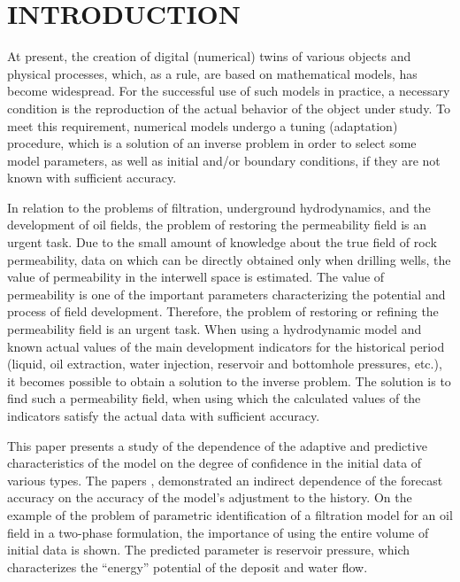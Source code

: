 \documentclass[
11pt,%
tightenlines,%
twoside,%
onecolumn,%
nofloats,%
nobibnotes,%
nofootinbib,%
superscriptaddress,%
noshowpacs,%
centertags]%
{revtex4}
\begin{document}
\section{INTRODUCTION}
	At present, the creation of digital (numerical) twins of various objects and physical processes, which, as a rule, are based on mathematical models, has become widespread. For the successful use of such models in practice, a necessary condition is the reproduction of the actual behavior of the object under study. To meet this requirement, numerical models undergo a tuning (adaptation) procedure, which is a solution of an inverse problem in order to select some model parameters, as well as initial and/or boundary conditions, if they are not known with sufficient accuracy. 
	
	In relation to the problems of filtration, underground hydrodynamics, and the development of oil fields, the problem of restoring the permeability field is an urgent task. Due to the small amount of knowledge about the true field of rock permeability, data on which can be directly obtained only when drilling wells, the value of permeability in the interwell space is estimated. The value of permeability is one of the important parameters characterizing the potential and process of field development. Therefore, the problem of restoring or refining the permeability field is an urgent task. When using a hydrodynamic model and known actual values of the main development indicators for the historical period (liquid, oil extraction, water injection, reservoir and bottomhole pressures, etc.), it becomes possible to obtain a solution to the inverse problem. The solution is to find such a permeability field, when using which the calculated values of the indicators satisfy the actual data with sufficient accuracy.

	This paper presents a study of the dependence of the adaptive and predictive characteristics of the model on the degree of confidence in the initial data of various types. The papers \cite{mus}, \cite{kos} demonstrated an indirect dependence of the forecast accuracy on the accuracy of the model's adjustment to the history. On the example of the problem of parametric identification of a filtration model for an oil field in a two-phase formulation, the importance of using the entire volume of initial data is shown. The predicted parameter is reservoir pressure, which characterizes the “energy” potential of the deposit and water flow.
\end{document}

